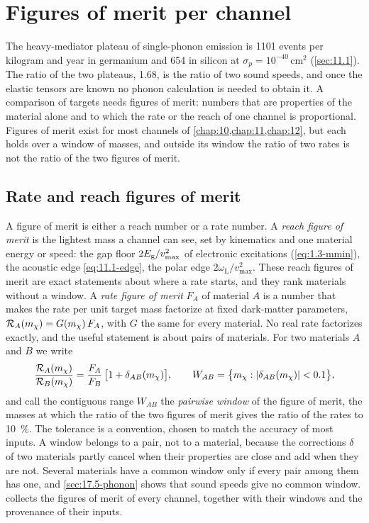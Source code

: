 \section{Figures of merit per channel}\label{sec:17.5}

The heavy-mediator plateau of single-phonon emission is 1101 events per kilogram and year in germanium and 654 in silicon at $\sigma_p = 10^{-40}\,\mathrm{cm^2}$ (\cref{sec:11.1}). The ratio of the two plateaus, 1.68, is the ratio of two sound speeds, and once the elastic tensors are known no phonon calculation is needed to obtain it. A comparison of targets needs figures of merit: numbers that are properties of the material alone and to which the rate or the reach of one channel is proportional. Figures of merit exist for most channels of \cref{chap:10,chap:11,chap:12}, but each holds over a window of masses, and outside its window the ratio of two rates is not the ratio of the two figures of merit.

\subsection{Rate and reach figures of merit}\label{sec:17.5-def}

A figure of merit is either a reach number or a rate number. A \emph{reach figure of merit} is the lightest mass a channel can see, set by kinematics and one material energy or speed: the gap floor $2E_{\mathrm{g}}/v_{\mathrm{max}}^2$ of electronic excitations (\cref{eq:1.3-mmin}), the acoustic edge \cref{eq:11.1-edge}, the polar edge $2\omega_{\mathrm{L}}/v_{\mathrm{max}}^2$. These reach figures of merit are exact statements about where a rate starts, and they rank materials without a window. A \emph{rate figure of merit} $F_A$ of material $A$ is a number that makes the rate per unit target mass factorize at fixed dark-matter parameters, $\mathcal{R}_A(m_{\chi}) = G(m_{\chi})\,F_A$, with $G$ the same for every material. No real rate factorizes exactly, and the useful statement is about pairs of materials. For two materials $A$ and $B$ we write
\begin{equation}
  \frac{\mathcal{R}_A(m_{\chi})}{\mathcal{R}_B(m_{\chi})} = \frac{F_A}{F_B}\,\bigl[1 + \delta_{AB}(m_{\chi})\bigr] ,
  \qquad
  W_{AB} = \bigl\{m_{\chi} : |\delta_{AB}(m_{\chi})| < 0.1\bigr\} ,
  \label{eq:17.5-window}
\end{equation}
and call the contiguous range $W_{AB}$ the \emph{pairwise window} of the figure of merit, the masses at which the ratio of the two figures of merit gives the ratio of the rates to \SI{10}{\percent}. The tolerance is a convention, chosen to match the accuracy of most inputs. A window belongs to a pair, not to a material, because the corrections $\delta$ of two materials partly cancel when their properties are close and add when they are not. Several materials have a common window only if every pair among them has one, and \cref{sec:17.5-phonon} shows that sound speeds give no common window.  collects the figures of merit of every channel, together with their windows and the provenance of their inputs.

